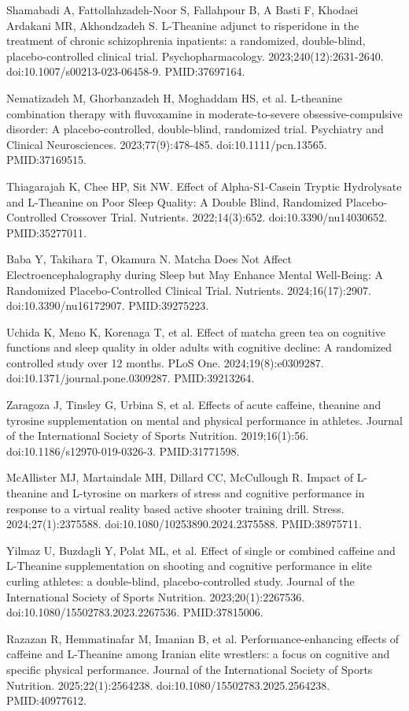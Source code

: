 \documentclass[11pt,oneside]{book}
\newcommand{\reff}[2]{\par\hangindent=7mm\hangafter=1\noindent[#1]\hspace{2mm}#2\par}
\begin{document}
\reff{51}{Shamabadi A, Fattollahzadeh-Noor S, Fallahpour B, A Basti F, Khodaei Ardakani MR, Akhondzadeh S. L-Theanine adjunct to risperidone in the treatment of chronic schizophrenia inpatients: a randomized, double-blind, placebo-controlled clinical trial. Psychopharmacology. 2023;240(12):2631-2640. doi:10.1007/s00213-023-06458-9. PMID:37697164.}
\reff{52}{Nematizadeh M, Ghorbanzadeh H, Moghaddam HS, et al. L-theanine combination therapy with fluvoxamine in moderate-to-severe obsessive-compulsive disorder: A placebo-controlled, double-blind, randomized trial. Psychiatry and Clinical Neurosciences. 2023;77(9):478-485. doi:10.1111/pcn.13565. PMID:37169515.}
\reff{53}{Thiagarajah K, Chee HP, Sit NW. Effect of Alpha-S1-Casein Tryptic Hydrolysate and L-Theanine on Poor Sleep Quality: A Double Blind, Randomized Placebo-Controlled Crossover Trial. Nutrients. 2022;14(3):652. doi:10.3390/nu14030652. PMID:35277011.}
\reff{54}{Baba Y, Takihara T, Okamura N. Matcha Does Not Affect Electroencephalography during Sleep but May Enhance Mental Well-Being: A Randomized Placebo-Controlled Clinical Trial. Nutrients. 2024;16(17):2907. doi:10.3390/nu16172907. PMID:39275223.}
\reff{55}{Uchida K, Meno K, Korenaga T, et al. Effect of matcha green tea on cognitive functions and sleep quality in older adults with cognitive decline: A randomized controlled study over 12 months. PLoS One. 2024;19(8):e0309287. doi:10.1371/journal.pone.0309287. PMID:39213264.}
\reff{56}{Zaragoza J, Tinsley G, Urbina S, et al. Effects of acute caffeine, theanine and tyrosine supplementation on mental and physical performance in athletes. Journal of the International Society of Sports Nutrition. 2019;16(1):56. doi:10.1186/s12970-019-0326-3. PMID:31771598.}
\reff{57}{McAllister MJ, Martaindale MH, Dillard CC, McCullough R. Impact of L-theanine and L-tyrosine on markers of stress and cognitive performance in response to a virtual reality based active shooter training drill. Stress. 2024;27(1):2375588. doi:10.1080/10253890.2024.2375588. PMID:38975711.}
\reff{58}{Yilmaz U, Buzdagli Y, Polat ML, et al. Effect of single or combined caffeine and L-Theanine supplementation on shooting and cognitive performance in elite curling athletes: a double-blind, placebo-controlled study. Journal of the International Society of Sports Nutrition. 2023;20(1):2267536. doi:10.1080/15502783.2023.2267536. PMID:37815006.}
\reff{59}{Razazan R, Hemmatinafar M, Imanian B, et al. Performance-enhancing effects of caffeine and L-Theanine among Iranian elite wrestlers: a focus on cognitive and specific physical performance. Journal of the International Society of Sports Nutrition. 2025;22(1):2564238. doi:10.1080/15502783.2025.2564238. PMID:40977612.}
\end{document}

